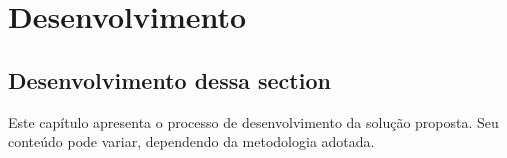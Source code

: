 \newpage
\chapter{Desenvolvimento}
\label{ch:desenvolvimento}

\section{Desenvolvimento dessa section}
\par Este capítulo apresenta o processo de desenvolvimento da solução proposta. Seu conteúdo pode variar, dependendo da metodologia adotada.
